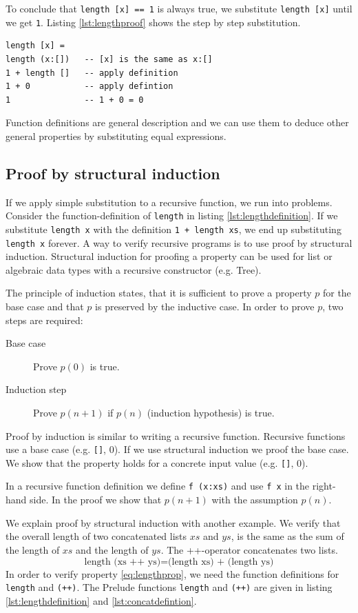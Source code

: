 To conclude that \verb|length [x] == 1| is always true, we substitute \verb|length [x]| until we get \verb|1|. Listing \ref{lst:lengthproof} shows the step by step substitution.
\begin{lstlisting}[caption={Deduce that the length of a list with one element is 1},label={lst:lengthproof}]
length [x] = 
length (x:[])   -- [x] is the same as x:[]
1 + length []   -- apply definition
1 + 0           -- apply defintion
1               -- 1 + 0 = 0
\end{lstlisting}
Function definitions are general description and we can use them to deduce other general properties by substituting equal expressions.

\subsection{Proof by structural induction}
\label{sec:induction}

If we apply simple substitution to a recursive function, we run into problems.
Consider the \gls{function-definition} of \verb|length| in listing \ref{lst:lengthdefinition}.
If we substitute \verb|length x| with the definition \verb|1 + length xs|, we end up substituting \verb|length x| forever. A way to verify recursive programs is to use proof by structural induction.  
Structural induction for proofing a property can be used for list or algebraic data types with a recursive constructor (e.g. Tree).

 The principle of induction states, that it is sufficient to prove a property $p$ for the base case and that $p$ is preserved by the inductive case. In order to prove $p$, two steps are required:
 \begin{description}
 \item[Base case] Prove $p(0)$ is true.
 \item[Induction step] Prove $p(n+1)$ if $p(n)$ (induction hypothesis) is true.
 \end{description}

Proof by induction is similar to writing a recursive function. Recursive functions use a base case (e.g. \verb|[]|, 0). 
If we use structural induction we proof the base case. We show that the property holds for a concrete input value (e.g. \verb|[]|, 0). 

In a recursive function definition we define \verb|f (x:xs)| and use \verb|f x| in the right-hand side. In the proof we show that $p(n+1)$ with the assumption $p(n)$.

We explain proof by structural induction with another example. We verify that the overall length of two concatenated lists $xs$ and $ys$, is the same as the sum of the length of $xs$ and the length of $ys$.  The ++-operator concatenates two lists.
\begin{equation}
  \label{eq:lengthprop}
  \text{length (xs ++ ys)} = \text{(length xs) + (length ys)}
\end{equation}
In order to verify property \ref{eq:lengthprop}, we need the function definitions for \verb|length| and \verb|(++)|.
The Prelude functions \verb|length| and \verb|(++)| are given in listing \ref{lst:lengthdefinition} and \ref{lst:concatdefintion}.

